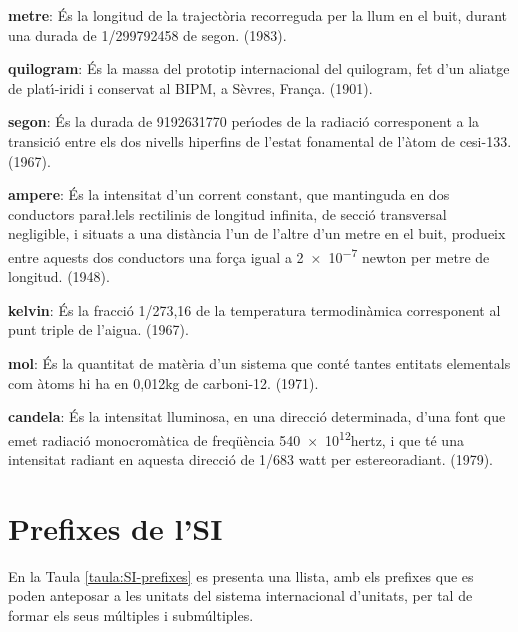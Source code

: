 \begin{list}{}
   {\setlength{\labelwidth}{22mm} \setlength{\leftmargin}{22mm} \setlength{\labelsep}{2mm}}
   \item[\textbf{metre}:] \'{E}s la longitud de la traject\`{o}ria recorreguda per la llum
   en el buit, durant una durada de 1/\num{299792458} de segon. (1983).
   \item[\textbf{quilogram}:] \'{E}s la massa del prototip internacional del quilogram, fet d'un aliatge de plat\'{\i}-iridi i
    conservat al \textsf{BIPM}, a S\`{e}vres, Fran\c{c}a. (1901).
   \item[\textbf{segon}:] \'{E}s la durada de \num{9192631770} per\'{\i}odes de la
   radiaci\'{o} corresponent a la transici\'{o} entre els dos nivells
  hiperfins de l'estat fonamental de l'\`{a}tom de cesi-133. (1967).
   \item[\textbf{ampere}:] \'{E}s la intensitat d'un corrent constant,
   que mantinguda en dos conductors para{\l.l}els rectilinis de longitud
   infinita, de secci\'{o} transversal negligible, i situats a una
   dist\`{a}ncia l'un de l'altre d'un metre en el buit, produeix entre
   aquests dos conductors  una for\c{c}a igual a \num{2e-7} newton per metre de longitud. (1948).
   \item[\textbf{kelvin}:] \'{E}s la fracci\'{o} 1/273,16 de la temperatura
   termodin\`{a}mica corresponent al punt triple de l'aigua. (1967).
   \item[\textbf{mol}:] \'{E}s la quantitat de mat\`{e}ria d'un sistema que cont\'{e} tantes
   entitats elementals com \`{a}toms hi ha en 0,012\unit{kg} de carboni-12. (1971).
   \item[\textbf{candela}:] \'{E}s la intensitat lluminosa, en una direcci\'{o} determinada,
   d'una font que emet radiaci\'{o} monocrom\`{a}tica de freq\"{u}\`{e}ncia \num{540e12}\unit{hertz}, i
   que t\'{e} una intensitat radiant en aquesta direcci\'{o} de 1/683 watt per estereoradiant. (1979).
\end{list}


\section{Prefixes de l'SI}

En la Taula \vref{taula:SI-prefixes} es presenta una llista, amb els
prefixes que es poden anteposar a les unitats del sistema
internacional d'unitats, per tal de formar els seus m\'{u}ltiples i
subm\'{u}ltiples.



